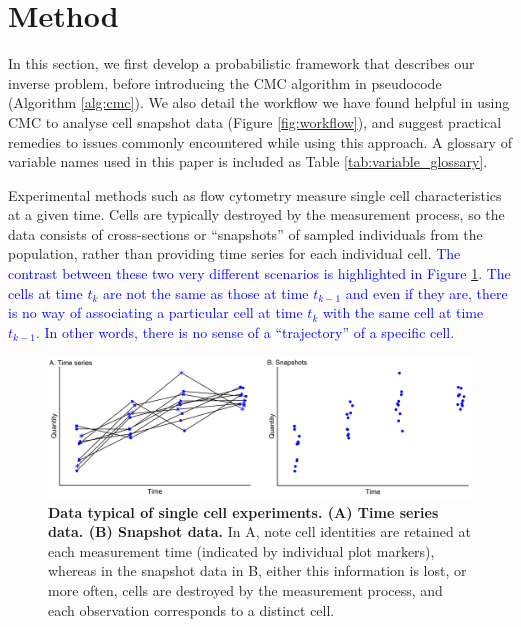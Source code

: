 \section{Method}\label{sec:method}
In this section, we first develop a probabilistic framework that describes our inverse problem, before introducing the CMC algorithm in pseudocode (Algorithm \ref{alg:cmc}). We also detail the workflow we have found helpful in using CMC to analyse cell snapshot data (Figure \ref{fig:workflow}), and suggest practical remedies to issues commonly encountered while using this approach. A glossary of variable names used in this paper is included as Table \ref{tab:variable_glossary}.

Experimental methods such as flow cytometry measure single cell characteristics at a given time. Cells are typically destroyed by the measurement process, so the data consists of cross-sections or ``snapshots'' of sampled individuals from the population, rather than providing time series for each individual cell. \textcolor{blue}{The contrast between these two very different scenarios is highlighted in Figure \ref{fig:time_series_v_snapshots}. The cells at time $t_k$ are not the same as those at time $t_{k-1}$ and even if they are, there is no way of associating a particular cell at time $t_k$ with the same cell at time $t_{k-1}$. In other words, there is no sense of a ``trajectory'' of a specific cell.}

\begin{figure}[H]
  \centerline{\includegraphics[width=\textwidth]{../figures/time_series_v_snapshots.pdf}}
  \caption{\textbf{Data typical of single cell experiments. (A) Time series data. (B) Snapshot data.} In A, note cell identities are retained at each measurement time (indicated by individual plot markers), whereas in the snapshot data in B, either this information is lost, or more often, cells are destroyed by the measurement process, and each observation corresponds to a distinct cell.}
  \label{fig:time_series_v_snapshots}
\end{figure}

